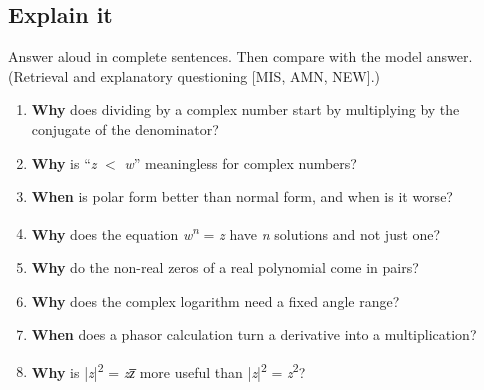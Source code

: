 \documentclass[11pt]{article}
\begin{document}
\begin{keepsection}
\section{Explain it}

Answer aloud in complete sentences. Then compare with the model answer. (Retrieval and explanatory questioning [MIS, AMN, NEW].)

\begin{enumerate}
\item \textbf{Why} does dividing by a complex number start by multiplying by the conjugate of the denominator?
\item \textbf{Why} is “\textit{z} \ensuremath{<} \textit{w}” meaningless for complex numbers?
\item \textbf{When} is polar form better than normal form, and when is it worse?
\item \textbf{Why} does the equation \textit{w}\textsuperscript{\textit{n}} = \textit{z} have \textit{n} solutions and not just one?
\item \textbf{Why} do the non-real zeros of a real polynomial come in pairs?
\item \textbf{Why} does the complex logarithm need a fixed angle range?
\item \textbf{When} does a phasor calculation turn a derivative into a multiplication?
\item \textbf{Why} is |\textit{z}|\textsuperscript{2} = \textit{z}\textit{z̅} more useful than |\textit{z}|\textsuperscript{2} = \textit{z}\textsuperscript{2}?
\end{enumerate}

\end{keepsection}

\clearpage
\end{document}
